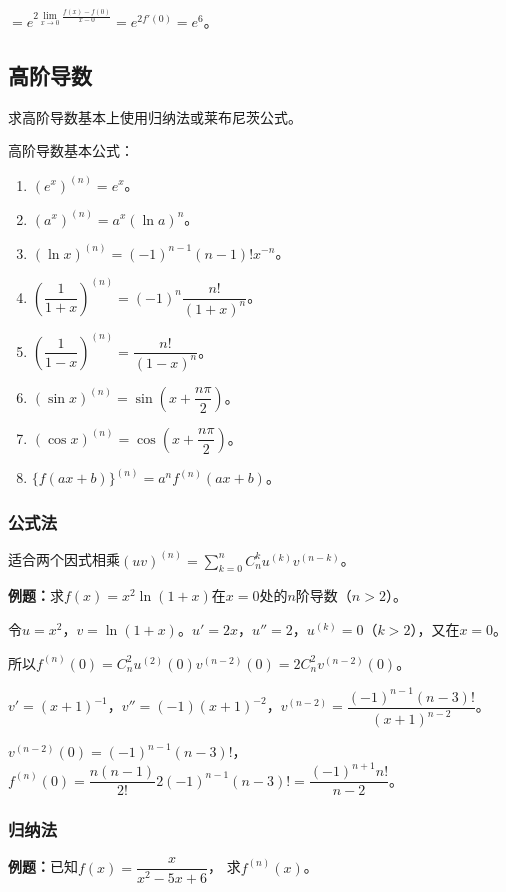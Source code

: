 $=e^{2\lim\limits_{x\to 0}\frac{f(x)-f(0)}{x-0}}=e^{2f'(0)}=e^6$。

\subsection{高阶导数}

求高阶导数基本上使用归纳法或莱布尼茨公式。

高阶导数基本公式：

\begin{enumerate}
    \item $(e^x)^{(n)}=e^x$。
    \item $(a^x)^{(n)}=a^x(\ln a)^n$。
    \item $(\ln x)^{(n)}=(-1)^{n-1}(n-1)!x^{-n}$。
    \item $\left(\dfrac{1}{1+x}\right)^{(n)}=(-1)^n\dfrac{n!}{(1+x)^n}$。
    \item $\left(\dfrac{1}{1-x}\right)^{(n)}=\dfrac{n!}{(1-x)^n}$。
    \item $(\sin x)^{(n)}=\sin\left(x+\dfrac{n\pi}{2}\right)$。
    \item $(\cos x)^{(n)}=\cos\left(x+\dfrac{n\pi}{2}\right)$。
    \item $\{f(ax+b)\}^{(n)}=a^nf^{(n)}(ax+b)$。
\end{enumerate}

\subsubsection{公式法}

适合两个因式相乘$(uv)^{(n)}=\sum\limits_{k=0}^nC_n^ku^{(k)}v^{(n-k)}$。

\textbf{例题：}求$f(x)=x^2\ln(1+x)$在$x=0$处的$n$阶导数（$n>2$）。

令$u=x^2$，$v=\ln(1+x)$。$u'=2x$，$u''=2$，$u^{(k)}=0$（$k>2$），又在$x=0$。

所以$f^{(n)}(0)=C_n^2u^{(2)}(0)v^{(n-2)}(0)=2C_n^2v^{(n-2)}(0)$。

$v'=(x+1)^{-1}$，$v''=(-1)(x+1)^{-2}$，$v^{(n-2)}=\dfrac{(-1)^{n-1}(n-3)!}{(x+1)^{n-2}}$。

$v^{(n-2)}(0)=(-1)^{n-1}(n-3)!$，$f^{(n)}(0)=\dfrac{n(n-1)}{2!}2(-1)^{n-1}(n-3)!=\dfrac{(-1)^{n+1}n!}{n-2}$。

\subsubsection{归纳法}

\textbf{例题：}已知$f(x)=\dfrac{x}{x^2-5x+6}$， 求$f^{(n)}(x)$。

